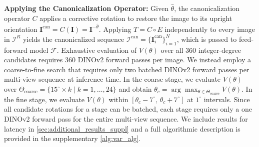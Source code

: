 
\textbf{Applying the Canonicalization Operator:}
Given $\hat{\theta}$, the canonicalization operator $C$ applies a corrective rotation to restore the image to its upright orientation $\mathbf{I}^{\mathrm{can}} = C(\mathbf{I}) = \mathbf{I}^{-\hat{\theta}}$. Applying $T = C \circ E$ independently to every image in $\mathcal{I}^R$ yields the canonicalized sequence $\mathcal{I}^{\mathrm{can}} = \{\mathbf{I}_i^{\mathrm{can}}\}_{i=1}^{N}$, which is passed to feed-forward model $\mathcal{F}$.
Exhaustive evaluation of $V(\theta)$ over all $360$ integer-degree candidates requires $360$ DINOv2 forward passes per image. 
We instead employ a coarse-to-fine search that requires only two batched DINOv2 forward passes per multi-view sequence at inference time. 
In the coarse stage, we evaluate $V(\theta)$ over $\Theta_\text{coarse} = \{15^\circ \times k \mid k = 1, \ldots, 24\}$ and obtain $\theta_c = \arg\max_{\theta \in \Theta_\text{coarse}} V(\theta)$.
In the fine stage, we evaluate $V(\theta)$ within $[\theta_c - 7^\circ,\, \theta_c + 7^\circ]$ at $1^\circ$ intervals.
Since all candidate rotations for a stage can be batched, each stage requires only a one DINOv2 forward pass for the entire multi-view sequence. We include results for latency in \cref{sec:additional_results_suppl} and a full algorithmic description is provided in the supplementary \cref{alg:var_alg}.


